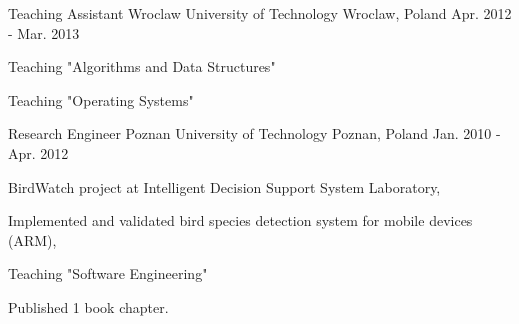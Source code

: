 \begin{cventries}
  \cventry
    {Teaching Assistant} %
    {Wroclaw University of Technology} %
    {Wroclaw, Poland} %
    {Apr. 2012 - Mar. 2013} %
    {
      \begin{cvitems} %
      	\item {Teaching "Algorithms and Data Structures"}
      	\item {Teaching "Operating Systems"}
      \end{cvitems}
    }

  \cventry
    {Research Engineer} %
    {Poznan University of Technology} %
    {Poznan, Poland} %
    {Jan. 2010 - Apr. 2012} %
    {
      \begin{cvitems} %
      	\item {BirdWatch project at Intelligent Decision Support System Laboratory,}
        \item {Implemented and validated bird species detection system for mobile devices (ARM), }
      	\item {Teaching "Software Engineering"}
        \item {Published 1 book chapter.}
      \end{cvitems}
    }


\end{cventries}
